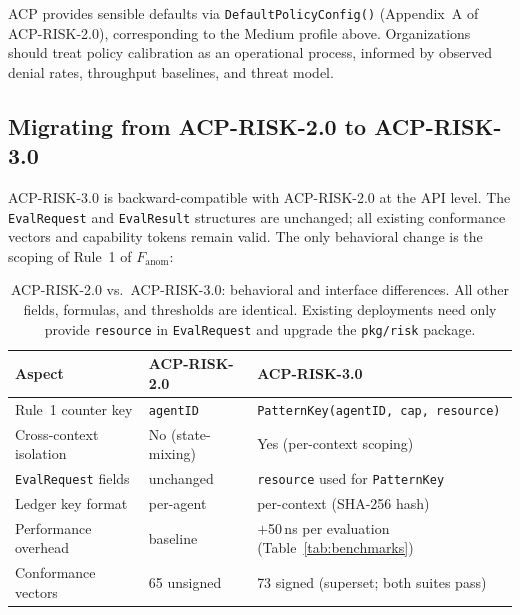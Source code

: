 \documentclass[11pt]{article}
\theoremstyle{definition}
\begin{document}
\noindent ACP provides sensible defaults via \texttt{DefaultPolicyConfig()}
(Appendix~A of ACP-RISK-2.0), corresponding to the Medium profile above.
Organizations should treat policy calibration as an operational process,
informed by observed denial rates, throughput baselines, and threat model.

\subsection{Migrating from ACP-RISK-2.0 to ACP-RISK-3.0}
\label{sec:migration}

ACP-RISK-3.0 is backward-compatible with ACP-RISK-2.0 at the API level.
The \texttt{EvalRequest} and \texttt{EvalResult} structures are unchanged;
all existing conformance vectors and capability tokens remain valid.
The only behavioral change is the scoping of Rule~1 of $F_\text{anom}$:

\begin{table}[h!]
\centering\small
\caption{ACP-RISK-2.0 vs.\ ACP-RISK-3.0: behavioral and interface differences.
All other fields, formulas, and thresholds are identical.
Existing deployments need only provide \texttt{resource} in \texttt{EvalRequest}
and upgrade the \texttt{pkg/risk} package.}
\label{tab:migration}
\begin{tabular}{@{}lll@{}}
\toprule
Aspect & ACP-RISK-2.0 & ACP-RISK-3.0 \\
\midrule
Rule~1 counter key   & \texttt{agentID} & \texttt{PatternKey(agentID, cap, resource)} \\
Cross-context isolation & No (state-mixing) & Yes (per-context scoping) \\
\texttt{EvalRequest} fields & unchanged & \texttt{resource} used for \texttt{PatternKey} \\
Ledger key format    & per-agent & per-context (SHA-256 hash) \\
Performance overhead & baseline & $+$50\,ns per evaluation (Table~\ref{tab:benchmarks}) \\
Conformance vectors  & 65 unsigned & 73 signed (superset; both suites pass) \\
\bottomrule
\end{tabular}
\end{table}
\end{document}
